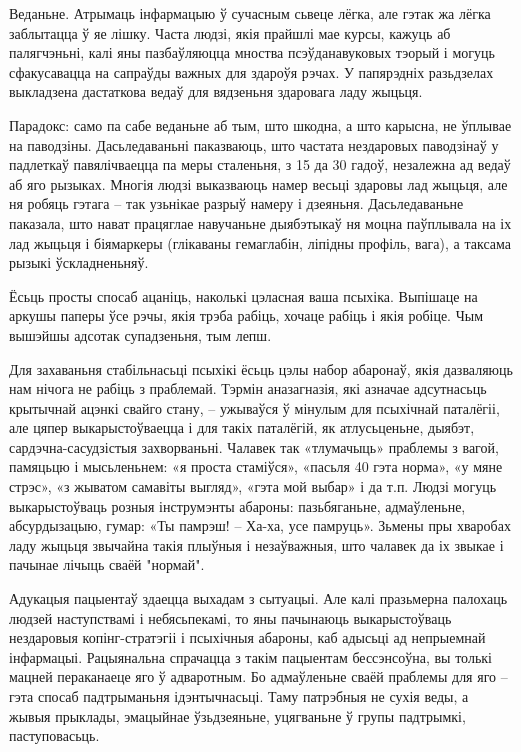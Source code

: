 Веданьне. Атрымаць інфармацыю ў сучасным сьвеце лёгка, але гэтак жа лёгка заблытацца ў яе лішку. Часта людзі, якія прайшлі мае курсы, кажуць аб палягчэньні, калі яны пазбаўляюцца мноства псэўданавуковых тэорый і могуць сфакусавацца на сапраўды важных для здароўя рэчах. У папярэдніх разьдзелах выкладзена дастаткова ведаў для вядзеньня здаровага ладу жыцьця.

Парадокс: само па сабе веданьне аб тым, што шкодна, а што карысна, не ўплывае на паводзіны. Дасьледаваньні паказваюць, што частата нездаровых паводзінаў у падлеткаў павялічваецца па меры сталеньня, з 15 да 30 гадоў, незалежна ад ведаў аб яго рызыках. Многія людзі выказваюць намер весьці здаровы лад жыцьця, але ня робяць гэтага – так узьнікае разрыў намеру і дзеяньня. Дасьледаваньне паказала, што нават працяглае навучаньне дыябэтыкаў ня моцна паўплывала на іх лад жыцьця і біямаркеры (глікаваны гемаглабін, ліпідны профіль, вага), а таксама рызыкі ўскладненьняў.

Ёсьць просты спосаб ацаніць, наколькі цэласная ваша псыхіка. Выпішаце на аркушы паперы ўсе рэчы, якія трэба рабіць, хочаце рабіць і якія робіце. Чым вышэйшы адсотак супадзеньня, тым лепш.

Для захаваньня стабільнасьці псыхікі ёсьць цэлы набор абаронаў, якія дазваляюць нам нічога не рабіць з праблемай. Тэрмін аназагназія, які азначае адсутнасьць крытычнай ацэнкі свайго стану, – ужываўся ў мінулым для псыхічнай паталёгіі, але цяпер выкарыстоўваецца і для такіх паталёгій, як атлусьценьне, дыябэт, сардэчна-сасудзістыя захворваньні. Чалавек так «тлумачыць» праблемы з вагой, памяцьцю і мысьленьнем: «я проста стаміўся», «пасьля 40 гэта норма», «у мяне стрэс», «з жыватом самавіты выгляд», «гэта мой выбар» і да т.п. Людзі могуць выкарыстоўваць розныя інструмэнты абароны: пазьбяганьне, адмаўленьне, абсурдызацыю, гумар: «Ты памрэш! – Ха-ха, усе памруць». Зьмены пры хваробах ладу жыцьця звычайна такія плыўныя і незаўважныя, што чалавек да іх звыкае і пачынае лічыць сваёй "нормай". 

Адукацыя пацыентаў здаецца выхадам з сытуацыі. Але калі празьмерна палохаць людзей наступствамі і небясьпекамі, то яны пачынаюць выкарыстоўваць нездаровыя копінг-стратэгіі і псыхічныя абароны, каб адысьці ад непрыемнай інфармацыі. Рацыянальна спрачацца з такім пацыентам бессэнсоўна, вы толькі мацней пераканаеце яго ў адваротным. Бо адмаўленьне сваёй праблемы для яго – гэта спосаб падтрыманьня ідэнтычнасьці. Таму патрэбныя не сухія веды, а жывыя прыклады, эмацыйнае ўзьдзеяньне, уцягваньне ў групы падтрымкі, паступовасьць.

